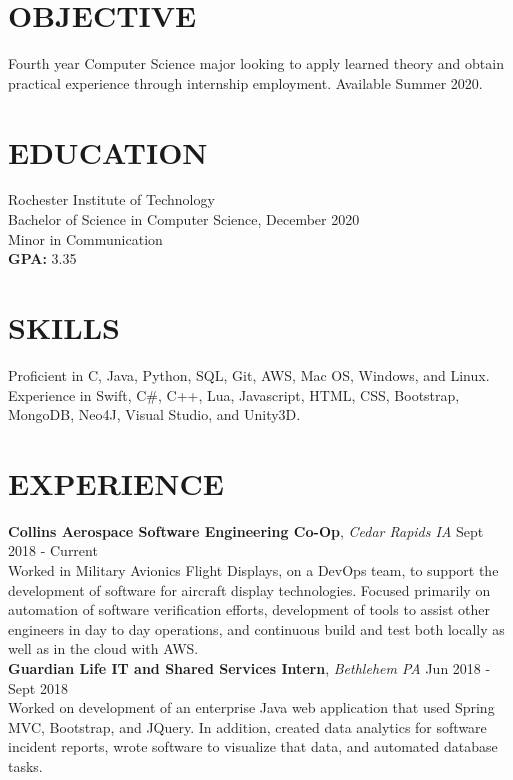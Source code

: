 \documentclass[line, margin]{res}
\begin{document}
\address{(484) 554-8487\\ emp9173@rit.edu}

\begin{resume}
\vspace{-7.5mm} %

\section{OBJECTIVE}
Fourth year Computer Science major looking to apply learned theory and obtain practical experience through internship employment. Available Summer 2020.

\section{EDUCATION} 
 Rochester Institute of Technology \\
 Bachelor of Science in Computer Science, December 2020\\
 Minor in Communication\\
 \textbf{GPA:} 3.35
 
\section{SKILLS}
Proficient in C, Java, Python, SQL, Git, AWS, Mac OS, Windows, and Linux. \\
Experience in Swift, C\#, C++, Lua, Javascript, HTML, CSS, Bootstrap, MongoDB, Neo4J, Visual Studio, and Unity3D.
 
 
\section{EXPERIENCE} 
\textbf{Collins Aerospace Software Engineering Co-Op}, \textit{Cedar Rapids IA} \hfill Sept 2018 - Current \\
Worked in Military Avionics Flight Displays, on a DevOps team, to support the development of software for aircraft display technologies.  Focused primarily on automation of software verification efforts, development of tools to assist other engineers in day to day operations, and continuous build and test both locally as well as in the cloud with AWS. \\ [10pt]
\textbf{Guardian Life IT and Shared Services Intern}, \textit{Bethlehem PA} \hfill Jun 2018 - Sept 2018 \\
Worked on development of an enterprise Java web application that used Spring MVC, Bootstrap, and JQuery.  In addition, created
data analytics for software incident reports, wrote software to visualize that data, and automated database tasks. \\
\vspace{-5.5mm}



\end{resume}
\end{document}
